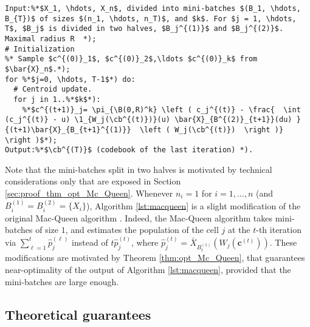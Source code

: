 \documentclass[noinfoline,preprint]{article}
\newcommand{\cb}{\mathbf{c}}
\renewcommand{\1}{\mathds 1}
\newcommand{\B}{\mathcal{B}}
\begin{document}
\medskip

\begin{lstlisting}[frame=single,caption={Mini-batch algorithm (Mac-Queen)},label={lst:macqueen},abovecaptionskip=-\medskipamount]
Input:%*$X_1, \hdots, X_n$, divided into mini-batches $(B_1, \hdots, B_{T})$ of sizes $(n_1, \hdots, n_T)$, and $k$. For $j = 1, \hdots, T$, $B_j$ is divided in two halves, $B_j^{(1)}$ and $B_j^{(2)}$. Maximal radius R  *);
# Initialization
%* Sample $c^{(0)}_1$, $c^{(0)}_2$,\ldots $c^{(0)}_k$ from $\bar{X}_n$.*);
for %*$j=0, \hdots, T-1$*) do:
  # Centroid update.
  for j in 1..%*$k$*):
    %*$c^{(t+1)}_j= \pi_{\B(0,R)^k} \left ( c_j^{(t)} - \frac{  \int  (c_j^{(t)} - u) \1_{W_j(\cb^{(t)})}(u) \bar{X}_{B^{(2)}_{t+1}}(du) }{(t+1)\bar{X}_{B_{t+1}^{(1)}}  \left ( W_j(\cb^{(t)})  \right )}  \right )$*);
Output:%*$\cb^{(T)}$ (codebook of the last iteration) *).
\end{lstlisting}

Note that the mini-batches split in two halves is motivated by technical considerations only that are exposed in Section \ref{sec:proof_thm_opt_Mc_Queen}.  
Whenever $n_i=1$ for $i=1, \hdots, n$ (and $B_i^{(1)} = B_i^{(2)} = \{X_i\}$), Algorithm \ref{lst:macqueen} is a slight modification of the original Mac-Queen algorithm \cite{MacQueen67}. Indeed, the Mac-Queen algorithm takes mini-batches of size $1$, and estimates the population of the cell $j$ at the $t$-th iteration via $\sum_{\ell=1}^t \hat{p}^{(\ell)}_j$ instead of $t \hat{p}_j^{(t)}$, where $\hat{p}_j^{(t)} = \bar{X}_{B^{(1)}_t}  \left ( W_j(\cb^{(t)})  \right )$. These modifications are motivated by Theorem \ref{thm:opt_Mc_Queen}, that guarantees near-optimality of the output of Algorithm \ref{lst:macqueen}, provided that the mini-batches are large enough. 

\subsection{Theoretical guarantees}
\end{document}
